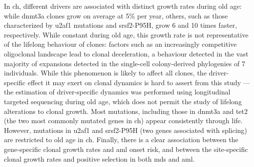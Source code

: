 In \ac{ch}, different drivers are associated with distinct growth rates during old age: while \ac{dnmt3a} clones grow on average at 5\% per year, others, such as those characterized by \ac{u2af1} mutations and \ac{srsf2}-P95H, grow 6 and 10 times faster, respectively. While constant during old age, this growth rate is not representative of the lifelong behaviour of clones: factors such as an increasingly competitive oligoclonal landscape lead to clonal deceleration, a behaviour detected in the vast majority of expansions detected in the single-cell colony-derived phylogenies of 7 individuals. While this phenomenon is likely to affect all clones, the driver-specific effect it may exert on clonal dynamics is hard to assert from this study --- the estimation of driver-specific dynamics was performed using longitudinal targeted sequencing during old age, which does not permit the study of lifelong alterations to clonal growth. Most mutations, including those in \ac{dnmt3a} and \ac{tet2} (the two most commonly mutated genes in \ac{ch}) appear consistently through life. However, mutations in \ac{u2af1} and \ac{srsf2}-P95H (two genes associated with splicing) are restricted to old age in \ac{ch}. Finally, there is a clear association between the gene-specific clonal growth rates and \ac{aml} onset risk, and between the site-specific clonal growth rates and positive selection in both \ac{mds} and \ac{aml}.

